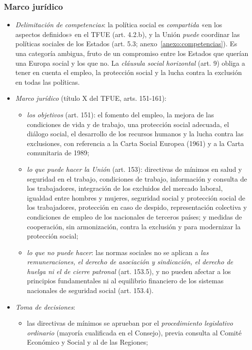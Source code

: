 \documentclass[11pt]{article}
\begin{document}
\subsubsection{Marco jurídico}

\begin{itemize}
\item \emph{Delimitación de competencias}: la política social es \emph{compartida} «en los aspectos definidos» en el TFUE (art. 4.2.b), y la Unión \emph{puede} coordinar las políticas sociales de los Estados (art. 5.3; anexo~\ref{anexo:competencias}). Es una categoría ambigua, fruto de un compromiso entre los Estados que querían una Europa social y los que no\nocite{UE2016TFUE}. La \emph{cláusula social horizontal} (art. 9) obliga a tener en cuenta el empleo, la protección social y la lucha contra la exclusión en todas las políticas.
\item \emph{Marco jurídico} (título X del TFUE, arts. 151-161):
  \begin{itemize}
  \item \emph{los objetivos} (art. 151): el fomento del empleo, la mejora de las condiciones de vida y de trabajo, una protección social adecuada, el diálogo social, el desarrollo de los recursos humanos y la lucha contra las exclusiones, con referencia a la Carta Social Europea (1961) y a la Carta comunitaria de 1989;
  \item \emph{lo que puede hacer la Unión} (art. 153): directivas de mínimos en salud y seguridad en el trabajo, condiciones de trabajo, información y consulta de los trabajadores, integración de los excluidos del mercado laboral, igualdad entre hombres y mujeres, seguridad social y protección social de los trabajadores, protección en caso de despido, representación colectiva y condiciones de empleo de los nacionales de terceros países; y medidas de cooperación, sin armonización, contra la exclusión y para modernizar la protección social;
  \item \emph{lo que no puede hacer}: las normas sociales no se aplican a \emph{las remuneraciones, el derecho de asociación y sindicación, el derecho de huelga ni el de cierre patronal} (art. 153.5), y no pueden afectar a los principios fundamentales ni al equilibrio financiero de los sistemas nacionales de seguridad social (art. 153.4).
  \end{itemize}
\item \emph{Toma de decisiones}:
  \begin{itemize}
  \item las directivas de mínimos se aprueban por el \emph{procedimiento legislativo ordinario} (mayoría cualificada en el Consejo), previa consulta al Comité Económico y Social y al de las Regiones;

\end{itemize}
\end{itemize}
\end{document}
